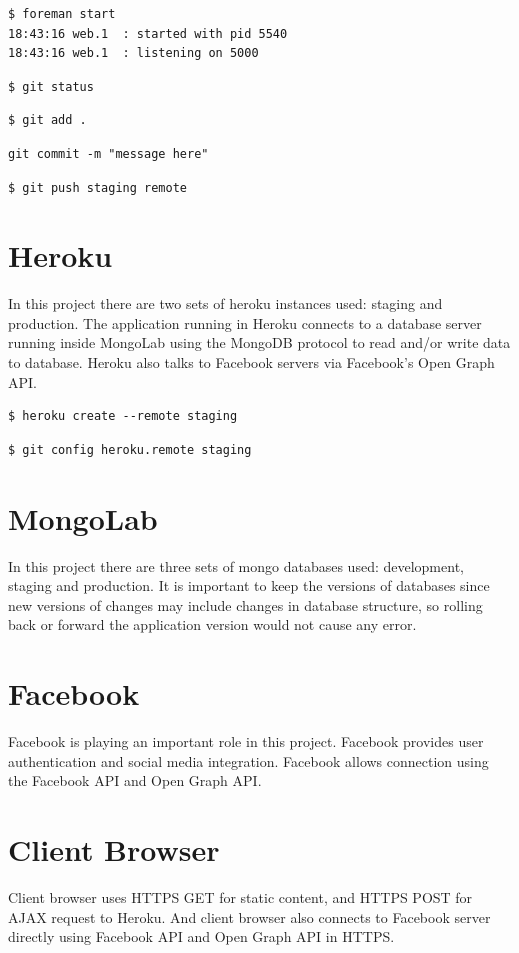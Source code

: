 \begin{lstlisting}
$ foreman start
18:43:16 web.1  : started with pid 5540
18:43:16 web.1  : listening on 5000
\end{lstlisting}


\begin{lstlisting}
$ git status
\end{lstlisting}

\begin{lstlisting}
$ git add .
\end{lstlisting}

\begin{lstlisting}
git commit -m "message here"
\end{lstlisting}

\begin{lstlisting}
$ git push staging remote
\end{lstlisting}



\section{Heroku}
In this project there are two sets of heroku instances used: staging and production. 
The application running in Heroku connects to a database server running inside MongoLab using the MongoDB protocol to read and/or write data to database.  Heroku also talks to Facebook servers via Facebook's Open Graph API.

\begin{lstlisting}
$ heroku create --remote staging
\end{lstlisting}

\begin{lstlisting}
$ git config heroku.remote staging
\end{lstlisting}

\section{MongoLab}
In this project there are three sets of mongo databases used: development, staging and production. It is important to keep the versions of databases since new versions of changes may include changes in database structure, so rolling back or forward the application version would not cause any error. 

\section{Facebook}
Facebook is playing an important role in this project. Facebook provides user authentication and social media integration. Facebook allows connection using the Facebook API and Open Graph API.

\section{Client Browser}
Client browser uses HTTPS GET for static content, and HTTPS POST for AJAX request to Heroku. And client browser also connects to Facebook server directly using Facebook API and Open Graph API in HTTPS.
 
